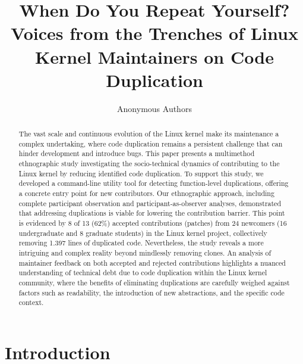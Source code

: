 \documentclass[sigconf]{acmart}
\begin{document}
\title{When Do You Repeat Yourself? Voices from the Trenches of Linux Kernel Maintainers on Code Duplication}

\author{Anonymous Authors}


\begin{abstract}
The vast scale and continuous evolution of the Linux kernel make its maintenance a complex undertaking, where code duplication remains a persistent challenge that can hinder development and introduce bugs.
%
This paper presents a multimethod ethnographic study investigating the socio-technical dynamics of contributing to the Linux kernel by reducing identified code duplication.
%
To support this study, we developed a command-line utility tool for detecting function-level duplications, offering a concrete entry point for new contributors.
%
Our ethnographic approach, including complete participant observation and participant-as-observer analyses, demonstrated that addressing duplications is viable for lowering the contribution barrier. This point is evidenced by 8 of 13 (62\%) accepted contributions (patches) from 24 newcomers (16 undergraduate and 8 graduate students) in the Linux kernel project, collectively removing 1.397 lines of duplicated code.
%
Nevertheless, the study reveals a more intriguing and complex reality beyond mindlessly removing clones. An analysis of maintainer feedback on both accepted and rejected contributions highlights a nuanced understanding of technical debt due to code duplication within the Linux kernel community, where the benefits of eliminating duplications are carefully weighed against factors such as readability, the introduction of new abstractions, and the specific code context.
\end{abstract}

\maketitle

\section{Introduction}
\label{sec:introduction}
\end{document}

